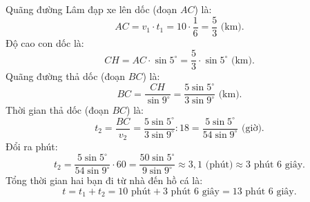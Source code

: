 \begin{bt}
{\begin{enumerate}[a)]
	Quãng đường Lâm đạp xe lên dốc (đoạn $AC$) là:
	$$AC = v_1 \cdot t_1 = 10 \cdot \dfrac{1}{6} = \dfrac{5}{3}\text{ (km)}.$$
	Độ cao con dốc là:
	$$CH = AC \cdot \sin 5^\circ = \dfrac{5}{3} \cdot \sin 5^\circ\text{ (km)}.$$
	Quãng đường thả dốc (đoạn $BC$) là:
	$$BC = \dfrac{CH}{\sin 9^\circ} = \dfrac{5\sin 5^\circ}{3\sin 9^\circ}\text{ (km)}.$$
	Thời gian thả dốc (đoạn $BC$) là:
	$$t_2 = \dfrac{BC}{v_2} = \dfrac{5\sin 5^\circ}{3\sin 9^\circ} : 18 = \dfrac{5\sin 5^\circ}{54\sin 9^\circ}\text{ (giờ)}.$$
	Đổi ra phút:
	$$t_2 = \dfrac{5\sin 5^\circ}{54\sin 9^\circ} \cdot 60 = \dfrac{50\sin 5^\circ}{9\sin 9^\circ} \approx 3{,}1\text{ (phút)} \approx 3\text{ phút } 6\text{ giây}.$$
	Tổng thời gian hai bạn đi từ nhà đến hồ cá là:
	$$t = t_1 + t_2 = 10\text{ phút} + 3\text{ phút } 6\text{ giây} = 13\text{ phút } 6\text{ giây}.$$
\end{enumerate}
}
\end{bt}

